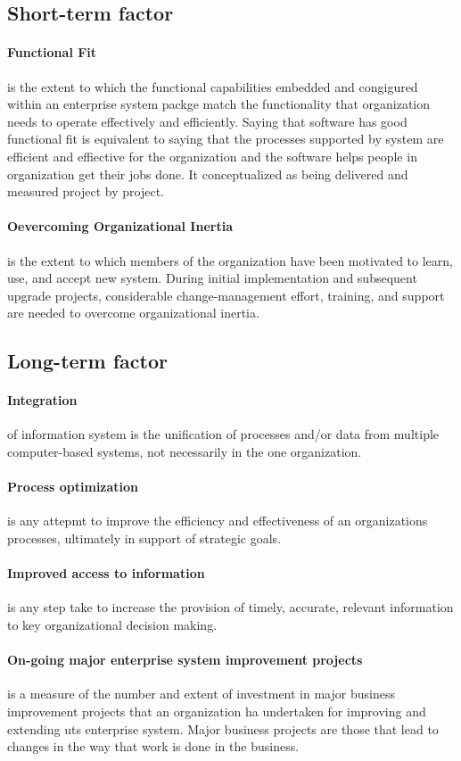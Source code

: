 \subsection{Short-term factor}
\paragraph{Functional Fit} is the extent to which the functional capabilities embedded and congigured within an enterprise system packge match the functionality that organization needs to operate effectively and efficiently. Saying that software has good functional fit is equivalent to saying that the processes supported by system are efficient and effiective for the organization and the software helps people in organization get their jobs done. It conceptualized as being delivered and measured project by project.
\paragraph{Oevercoming Organizational Inertia} is the extent to which members of the organization have been motivated to learn, use, and accept new system. During initial implementation and subsequent upgrade projects, considerable change-management effort, training, and support are needed to overcome organizational inertia.

\subsection{Long-term factor}
\paragraph{Integration} of information system is the unification of processes and/or data from multiple computer-based systems, not necessarily in the one organization.
\paragraph{Process optimization} is any attepmt to improve the efficiency and effectiveness of an organizations processes, ultimately in support of strategic goals.
\paragraph{Improved access to information} is any step take to increase the provision of timely, accurate, relevant information to key organizational decision making.
\paragraph{On-going major enterprise system improvement projects} is a measure of the number and extent of investment in major business improvement projects that an organization ha undertaken for improving and extending uts enterprise system. Major business projects are those that lead to changes in the way that work is done in the business.

